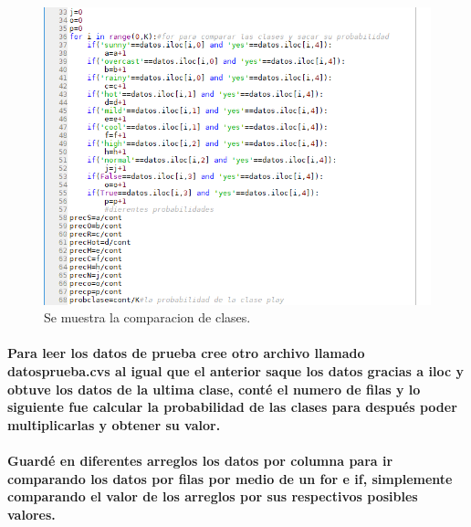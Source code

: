 \documentclass[10pt,a4paper]{article}
\begin{document}
\begin{figure}[h]
\includegraphics[scale=0.4] {codigo2.png}
\caption{Se muestra la comparacion de clases.}
\label{fig:Binarizacion}
\end{figure}

\paragraph{Para leer los datos de prueba cree otro archivo llamado datosprueba.cvs al igual que el anterior saque los datos gracias a iloc y obtuve los datos de la ultima clase, cont\'e el numero de filas y lo siguiente fue calcular la probabilidad de las clases para despu\'es poder multiplicarlas y obtener su valor.}

\paragraph{Guard\'e en diferentes arreglos los datos por columna para ir comparando los datos por filas por medio de un for e if, simplemente comparando el valor de los arreglos por sus respectivos posibles valores.}
\end{document}
